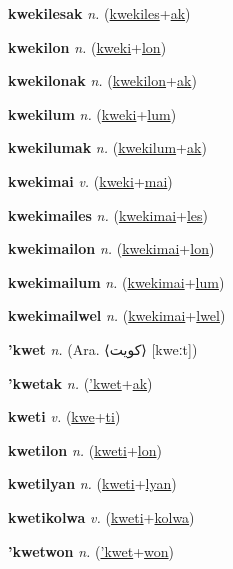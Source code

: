 \textbf{\hypertarget{kwekilesak}{kwekilesak}} \textit{n.} (\hyperlink{kwekiles}{kwekiles}+\allowbreak \hyperlink{ak}{ak})


\textbf{\hypertarget{kwekilon}{kwekilon}} \textit{n.} (\hyperlink{kweki}{kweki}+\allowbreak \hyperlink{lon}{lon})


\textbf{\hypertarget{kwekilonak}{kwekilonak}} \textit{n.} (\hyperlink{kwekilon}{kwekilon}+\allowbreak \hyperlink{ak}{ak})


\textbf{\hypertarget{kwekilum}{kwekilum}} \textit{n.} (\hyperlink{kweki}{kweki}+\allowbreak \hyperlink{lum}{lum})


\textbf{\hypertarget{kwekilumak}{kwekilumak}} \textit{n.} (\hyperlink{kwekilum}{kwekilum}+\allowbreak \hyperlink{ak}{ak})


\textbf{\hypertarget{kwekimai}{kwekimai}} \textit{v.} (\hyperlink{kweki}{kweki}+\allowbreak \hyperlink{mai}{mai})


\textbf{\hypertarget{kwekimailes}{kwekimailes}} \textit{n.} (\hyperlink{kwekimai}{kwekimai}+\allowbreak \hyperlink{les}{les})


\textbf{\hypertarget{kwekimailon}{kwekimailon}} \textit{n.} (\hyperlink{kwekimai}{kwekimai}+\allowbreak \hyperlink{lon}{lon})


\textbf{\hypertarget{kwekimailum}{kwekimailum}} \textit{n.} (\hyperlink{kwekimai}{kwekimai}+\allowbreak \hyperlink{lum}{lum})


\textbf{\hypertarget{kwekimailwel}{kwekimailwel}} \textit{n.} (\hyperlink{kwekimai}{kwekimai}+\allowbreak \hyperlink{lwel}{lwel})


\textbf{\hypertarget{'kwet}{'kwet}} \textit{n.} (Ara. ⟨{\arabics{}كويت}⟩ [kweːt])


\textbf{\hypertarget{'kwetak}{'kwetak}} \textit{n.} (\hyperlink{'kwet}{'kwet}+\allowbreak \hyperlink{ak}{ak})


\textbf{\hypertarget{kweti}{kweti}} \textit{v.} (\hyperlink{kwe}{kwe}+\allowbreak \hyperlink{ti}{ti})


\textbf{\hypertarget{kwetilon}{kwetilon}} \textit{n.} (\hyperlink{kweti}{kweti}+\allowbreak \hyperlink{lon}{lon})


\textbf{\hypertarget{kwetilyan}{kwetilyan}} \textit{n.} (\hyperlink{kweti}{kweti}+\allowbreak \hyperlink{lyan}{lyan})


\textbf{\hypertarget{kwetikolwa}{kwetikolwa}} \textit{v.} (\hyperlink{kweti}{kweti}+\allowbreak \hyperlink{kolwa}{kolwa})


\textbf{\hypertarget{'kwetwon}{'kwetwon}} \textit{n.} (\hyperlink{'kwet}{'kwet}+\allowbreak \hyperlink{won}{won})


